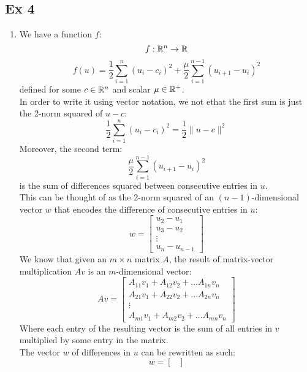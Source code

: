 \documentclass[12pt]{article}
\begin{document}
    \newpage

    \subsection*{Ex 4}

    \begin{enumerate}[label=\alph*)]
        \item 
        We have a function $f$:
        \[ f:\mathbb{R}^n \to \mathbb{R} \]
        \[ f(u) 
        = \dfrac{1}{2}\sum_{i=1}^{n}(u_i - c_i)^2
        + \dfrac{\mu}{2}\sum_{i=1}^{n-1}(u_{i+1} - u_i)^2
        \]
        defined for some $c \in \mathbb{R}^n$
        and scalar $\mu \in \mathbb{R}^+$. \\
        In order to write it using vector notation,
        we not ethat the first sum is just
        the 2-norm squared of $u - c$:
        \[ \dfrac{1}{2}\sum_{i=1}^{n}(u_i - c_i)^2
        = \dfrac{1}{2}\| u - c \|^2 \]
        Moreover, the second term:
        \[ \dfrac{\mu}{2}
        \sum_{i=1}^{n-1}(u_{i+1} - u_i)^2 \]
        is the sum of differences squared between
        consecutive entries in $u$. \\
        This can be thought of as the 2-norm squared
        of an $(n-1)$-dimensional vector $w$
        that encodes the difference of consecutive
        entries in $u$:
        \[ w = \begin{bmatrix}
            u_2 - u_1 \\
            u_3 - u_2 \\
            \vdots \\
            u_n - u_{n-1}
        \end{bmatrix} \]
        We know that given an $m \times n$
        matrix $A$,
        the result of matrix-vector
        multiplication $Av$ is
        an $m$-dimensional vector:
        \[ Av = \begin{bmatrix}
            A_{11}v_1 + A_{12}v_2 + \dots A_{1n}v_n \\
            A_{21}v_1 + A_{22}v_2 + \dots A_{2n}v_n \\
            \vdots \\
            A_{m1}v_1 + A_{m2}v_2 + \dots A_{mn}v_n
        \end{bmatrix} \]
        Where each entry of the resulting
        vector is the sum of all entries
        in $v$ multiplied by some entry
        in the matrix. \\
        The vector $w$ of differences in $u$
        can be rewritten as such:
        \[ w = \begin{bmatrix}

\end{bmatrix}\]
\end{enumerate}
\end{document}
